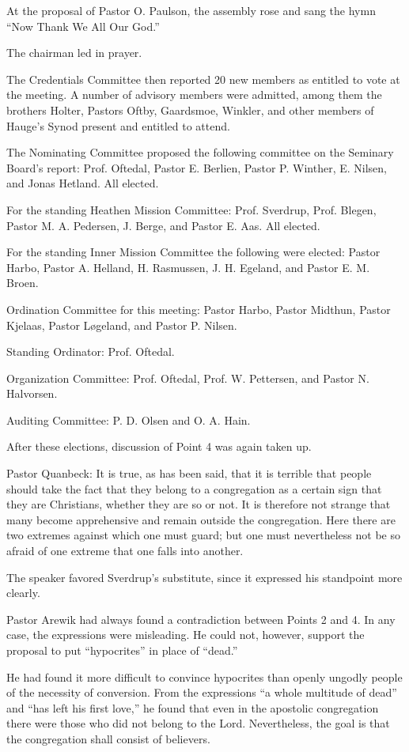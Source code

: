 At the proposal of Pastor O. Paulson, the assembly rose and sang the hymn “Now Thank We All Our God.”

The chairman led in prayer.

The Credentials Committee then reported 20 new members as entitled to vote at the meeting. A number of advisory members were admitted, among them the brothers Holter, Pastors Oftby, Gaardsmoe, Winkler, and other members of Hauge’s Synod present and entitled to attend.

The Nominating Committee proposed the following committee on the Seminary Board’s report: Prof. Oftedal, Pastor E. Berlien, Pastor P. Winther, E. Nilsen, and Jonas Hetland. All elected.

For the standing Heathen Mission Committee: Prof. Sverdrup, Prof. Blegen, Pastor M. A. Pedersen, J. Berge, and Pastor E. Aas. All elected.

For the standing Inner Mission Committee the following were elected: Pastor Harbo, Pastor A. Helland, H. Rasmussen, J. H. Egeland, and Pastor E. M. Broen.

Ordination Committee for this meeting: Pastor Harbo, Pastor Midthun, Pastor Kjelaas, Pastor Løgeland, and Pastor P. Nilsen.

Standing Ordinator: Prof. Oftedal.

Organization Committee: Prof. Oftedal, Prof. W. Pettersen, and Pastor N. Halvorsen.

Auditing Committee: P. D. Olsen and O. A. Hain.

After these elections, discussion of Point 4 was again taken up.

Pastor Quanbeck: It is true, as has been said, that it is terrible that people should take the fact that they belong to a congregation as a certain sign that they are Christians, whether they are so or not. It is therefore not strange that many become apprehensive and remain outside the congregation. Here there are two extremes against which one must guard; but one must nevertheless not be so afraid of one extreme that one falls into another.

The speaker favored Sverdrup’s substitute, since it expressed his standpoint more clearly.

Pastor Arewik had always found a contradiction between Points 2 and 4. In any case, the expressions were misleading. He could not, however, support the proposal to put “hypocrites” in place of “dead.”

He had found it more difficult to convince hypocrites than openly ungodly people of the necessity of conversion. From the expressions “a whole multitude of dead” and “has left his first love,” he found that even in the apostolic congregation there were those who did not belong to the Lord. Nevertheless, the goal is that the congregation shall consist of believers.

